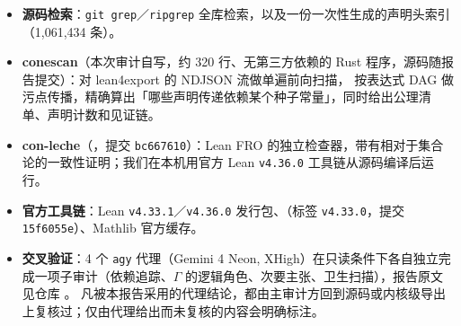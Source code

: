 \begin{itemize}
\item \textbf{源码检索}：\texttt{git grep}／\texttt{ripgrep} 全库检索，以及一份一次性生成的声明头索引（1,061,434 条）。
\item \textbf{conescan}（本次审计自写，约 320 行、无第三方依赖的 Rust 程序，源码随报告提交）：对 lean4export 的 NDJSON 流做单遍前向扫描，
按表达式 DAG 做污点传播，精确算出「哪些声明传递依赖某个种子常量」，同时给出公理清单、声明计数和见证链。
\item \textbf{con-leche}（，提交 \texttt{bc667610}）：Lean FRO 的独立检查器，带有相对于集合论的一致性证明；我们在本机用官方 Lean \texttt{v4.36.0} 工具链从源码编译后运行。
\item \textbf{官方工具链}：Lean \texttt{v4.33.1}／\texttt{v4.36.0} 发行包、（标签 \texttt{v4.33.0}，提交 \texttt{15f6055e}）、Mathlib 官方缓存。
\item \textbf{交叉验证}：4 个 \texttt{agy} 代理（Gemini 4 Neon, XHigh）在只读条件下各自独立完成一项子审计（依赖追踪、$\Gamma$ 的逻辑角色、次要主张、卫生扫描），报告原文见仓库 。
凡被本报告采用的代理结论，都由主审计方回到源码或内核级导出上复核过；仅由代理给出而未复核的内容会明确标注。
\end{itemize}
